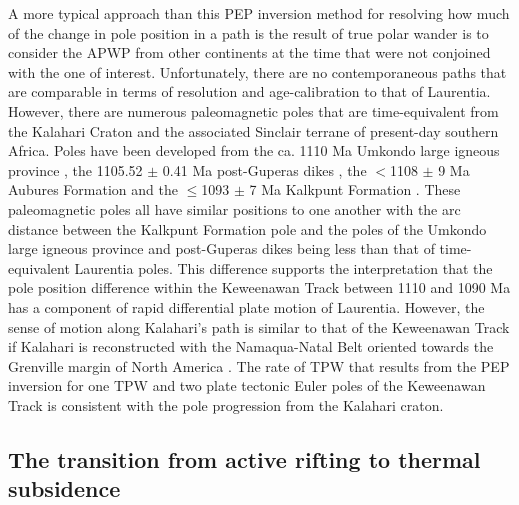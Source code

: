 \documentclass[11pt,letterpaper]{article}
\begin{document}
A more typical approach than this PEP inversion method for resolving how much of the change in pole position in a path is the result of true polar wander is to consider the APWP from other continents at the time that were not conjoined with the one of interest. Unfortunately, there are no contemporaneous paths that are comparable in terms of resolution and age-calibration to that of Laurentia. However, there are numerous paleomagnetic poles that are time-equivalent from the Kalahari Craton and the associated Sinclair terrane of present-day southern Africa. Poles have been developed from the ca. 1110 Ma Umkondo large igneous province \citep{Swanson-Hysell2015b}, the 1105.52 $\pm$ 0.41 Ma post-Guperas dikes \citep{Panzik2015a}, the $<$1108 $\pm$ 9 Ma Aubures Formation \citep{Kasbohm2015a} and the $\leq$1093 $\pm$ 7 Ma Kalkpunt Formation \citep{Briden1979a,Pettersson2007a}. These paleomagnetic poles all have similar positions to one another with the arc distance between the Kalkpunt Formation pole and the poles of the Umkondo large igneous province and post-Guperas dikes being less than that of time-equivalent Laurentia poles. This difference supports the interpretation that the pole position difference within the Keweenawan Track between 1110 and 1090 Ma has a component of rapid differential plate motion of Laurentia. However, the sense of motion along Kalahari's path is similar to that of the Keweenawan Track if Kalahari is reconstructed with the Namaqua-Natal Belt oriented towards the Grenville margin of North America \citep{Kasbohm2015a, Swanson-Hysell2015b}. The rate of TPW that results from the PEP inversion for one TPW and two plate tectonic Euler poles of the Keweenawan Track is consistent with the pole progression from the Kalahari craton.

\subsection{The transition from active rifting to thermal subsidence}
\end{document}

